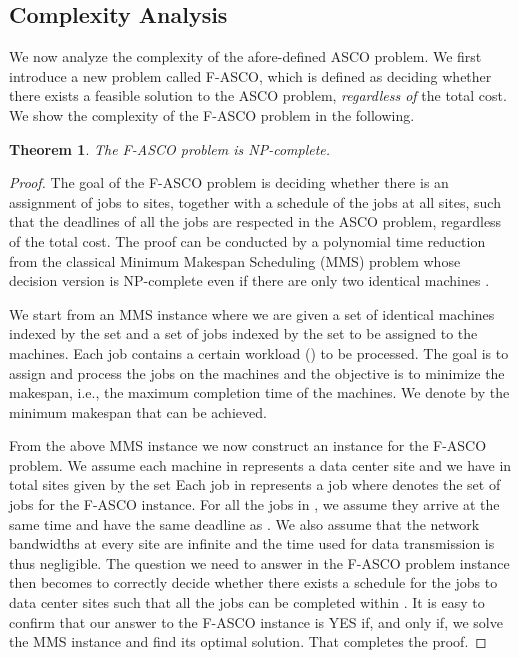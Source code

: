 \documentclass{article}
\newtheorem{theorem}{Theorem}
\begin{document}
\subsection{Complexity Analysis}
We now analyze the complexity of the afore-defined ASCO problem. We first introduce a new problem called F-ASCO, which is defined as deciding whether there exists a feasible solution to the ASCO problem, \textit{regardless of} the total cost. We show the complexity of the F-ASCO problem in the following.
\begin{theorem}
The F-ASCO problem is NP-complete.
\end{theorem}
\begin{proof}
The goal of the F-ASCO problem is deciding whether there is an assignment of jobs to sites, together with a schedule of the jobs at all sites, such that the deadlines of all the jobs are respected in the ASCO problem, regardless of the total cost. The proof can be conducted by a polynomial time reduction from the classical Minimum Makespan Scheduling (MMS)  problem whose decision version is NP-complete even if there are only two identical machines \cite{Garey-MMS-1979}. 

We start from an MMS instance where we are given a set of identical machines indexed by the set  and a set of jobs indexed by the set  to be assigned to the machines. Each job contains a certain workload  () to be processed. The goal is to assign and process the jobs on the machines and the objective is to minimize the makespan, i.e., the maximum completion time of the machines. We denote by  the minimum makespan that can be achieved.

From the above MMS instance we now construct an instance for the F-ASCO problem. We assume each machine in  represents a data center site  and we have in total  sites given by the set  Each job  in  represents a job  where  denotes the set of jobs for the F-ASCO instance. For all the jobs in , we assume they arrive at the same time and have the same deadline as . We also assume that the network bandwidths at every site are infinite and the time used for data transmission is thus negligible. The question we need to answer in the F-ASCO problem instance then becomes to correctly decide whether there exists a schedule for the jobs to data center sites such that all the jobs can be completed within . It is easy to confirm that our answer to the F-ASCO instance is YES if, and only if, we solve the MMS instance and find its optimal solution. That completes the proof.
\end{proof}
\end{document}
